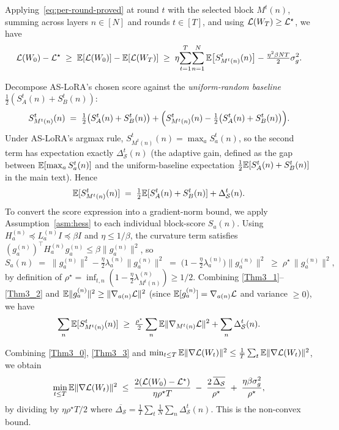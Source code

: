 Applying~\eqref{eq:per-round-proved} at round $t$ with the selected block $M^t(n)$, summing across layers $n\in[N]$ and rounds $t\in[T]$, and using $\mathcal{L}(W_T)\ge\mathcal{L}^\star$, we have 
\begin{equation}\label{Thm3_0}
\mathcal{L}(W_0)-\mathcal{L}^\star \;\ge\; \mathbb{E}[\mathcal{L}(W_0)]-\mathbb{E}[\mathcal{L}(W_T)] \;\ge\; \eta\!\sum_{t=1}^T\!\sum_{n=1}^N \mathbb{E}\bigl[S_{M^t(n)}^t(n)\bigr] - \tfrac{\eta^2\beta NT}{2}\sigma_g^2.
\end{equation}

 Decompose AS-LoRA's chosen score against the \emph{uniform-random baseline} $\tfrac{1}{2}(S_A^t(n)+S_B^t(n))$:
\begin{equation}
S_{M^t(n)}^t(n) \;=\; \tfrac{1}{2}\bigl(S_A^t(n)+S_B^t(n)\bigr) + \Bigl(S_{M^t(n)}^t(n)-\tfrac{1}{2}\bigl(S_A^t(n)+S_B^t(n)\bigr)\Bigr).
\end{equation}
Under AS-LoRA's argmax rule, $S_{M^t(n)}^t(n)=\max_a S_a^t(n)$, so the second term has expectation exactly $\Delta_{\mathcal S}^t(n)$ (the adaptive gain, defined as the gap between $\mathbb{E}[\max_a S_a^t(n)]$ and the uniform-baseline expectation $\tfrac{1}{2}\mathbb{E}[S_A^t(n)+S_B^t(n)]$ in the main text). Hence
\begin{equation} \label{Thm3_1}
\mathbb{E}[S_{M^t(n)}^t(n)] \;=\; \tfrac{1}{2}\mathbb{E}[S_A^t(n)+S_B^t(n)] + \Delta_{\mathcal S}^t(n).
\end{equation}
To convert the score expression into a gradient-norm bound, we apply Assumption~\ref{asm:hess} to each individual block-score $S_a(n)$. Using $H_a^{(n)}\preceq L_a^{(n)} I\preceq\beta I$ and $\eta\le 1/\beta$, the curvature term satisfies $(g_a^{(n)})^\top H_a^{(n)} g_a^{(n)}\le\beta\|g_a^{(n)}\|^2$, so
\begin{equation} \label{Thm3_2}
S_a(n) \;=\; \|g_a^{(n)}\|^2-\tfrac{\eta}{2}\lambda_a^{(n)}\|g_a^{(n)}\|^2 \;=\; \bigl(1-\tfrac{\eta}{2}\lambda_a^{(n)}\bigr)\|g_a^{(n)}\|^2 \;\ge\; \rho^\star\,\|g_a^{(n)}\|^2,
\end{equation}
by definition of $\rho^\star=\inf_{t,n}(1-\tfrac{\eta}{2}\lambda_{M^t(n)}^{(n)})\ge 1/2$. Combining \eqref{Thm3_1}--\eqref{Thm3_2} and $\mathbb{E}\|g_a^{(n)}\|^2\ge\|\nabla_{a(n)}\mathcal{L}\|^2$ (since $\mathbb{E}[g_a^{(n)}]=\nabla_{a(n)}\mathcal{L}$ and variance $\ge 0$), we have 
\begin{equation}\label{Thm3_3}
\sum_n\mathbb{E}[S_{M^t(n)}^t(n)] \;\ge\; \tfrac{\rho^\star}{2}\sum_n\mathbb{E}\|\nabla_{M^t(n)}\mathcal{L}\|^2 + \sum_n\Delta_{\mathcal S}^t(n).
\end{equation}


Combining \eqref{Thm3_0}, \eqref{Thm3_3} and  $\min_{t\le T}\mathbb{E}\|\nabla\mathcal{L}(W_t)\|^2 \le \tfrac{1}{T}\sum_t\mathbb{E}\|\nabla\mathcal{L}(W_t)\|^2$, we obtain
\begin{equation}
\min_{t\le T}\mathbb{E}\|\nabla\mathcal{L}(W_t)\|^2 \;\le\; \frac{2(\mathcal{L}(W_0)-\mathcal{L}^\star)}{\eta\rho^\star T} \;-\; \frac{2\,\overline{\Delta_{\mathcal S}}}{\rho^\star} \;+\; \frac{\eta\beta\sigma_g^2}{\rho^\star},
\end{equation}
by dividing by $\eta\rho^\star T/2$ where $\overline{\Delta_{\mathcal S}}=\tfrac{1}{T}\sum_t\tfrac{1}{N}\sum_n\Delta_{\mathcal S}^t(n)$. This is the non-convex bound.


